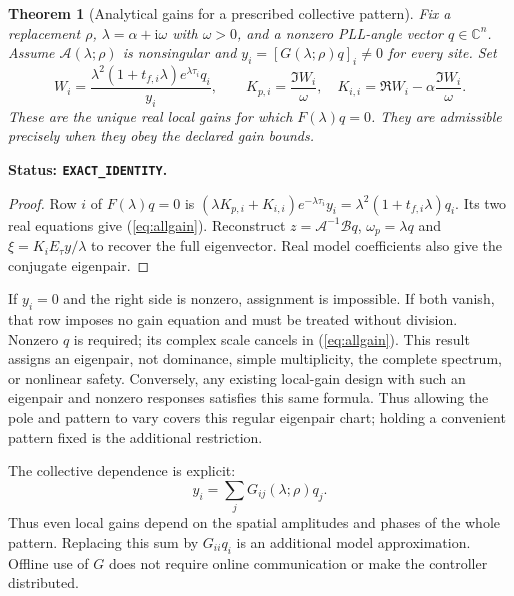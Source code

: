 \documentclass[11pt]{article}
\newtheorem{theorem}{Theorem}
\newcommand{\ii}{\mathrm{i}}
\newcommand{\status}[1]{\par\smallskip\noindent\textbf{Status: \texttt{#1}.}\ }
\begin{document}
\begin{theorem}[Analytical gains for a prescribed collective pattern]
Fix a replacement $\rho$, $\lambda=\alpha+\ii\omega$ with $\omega>0$,
and a nonzero PLL-angle vector $q\in\mathbb C^n$. Assume
$\mathcal A(\lambda;\rho)$ is nonsingular and
$y_i=[G(\lambda;\rho)q]_i\ne0$ for every site.
Set
\begin{equation}
 W_i=\frac{\lambda^2(1+t_{f,i}\lambda)e^{\lambda\tau_i}q_i}{y_i},
 \qquad
 \boxed{K_{p,i}=\frac{\Im W_i}{\omega},\quad
 K_{i,i}=\Re W_i-\alpha\frac{\Im W_i}{\omega}.} \label{eq:allgain}
\end{equation}
These are the unique real local gains for which $F(\lambda)q=0$.
They are admissible precisely when they obey the declared gain bounds.
\end{theorem}
\status{EXACT\_IDENTITY}
\begin{proof}
Row $i$ of $F(\lambda)q=0$ is
$(\lambda K_{p,i}+K_{i,i})e^{-\lambda\tau_i}y_i
=\lambda^2(1+t_{f,i}\lambda)q_i$.
Its two real equations give (\ref{eq:allgain}). Reconstruct
$z=\mathcal A^{-1}\mathcal Bq$, $\omega_p=\lambda q$ and
$\xi=K_iE_\tau y/\lambda$ to recover the full eigenvector.
Real model coefficients also give the conjugate eigenpair.
\end{proof}
If $y_i=0$ and the right side is nonzero, assignment is impossible.
If both vanish, that row imposes no gain equation and must be treated
without division. Nonzero $q$ is required; its complex scale cancels
in (\ref{eq:allgain}). This result assigns an eigenpair, not dominance,
simple multiplicity, the complete spectrum, or nonlinear safety.
Conversely, any existing local-gain design with such an eigenpair
and nonzero responses satisfies this same formula. Thus allowing
the pole and pattern to vary covers this regular eigenpair chart;
holding a convenient pattern fixed is the additional restriction.

The collective dependence is explicit:
\[
 y_i=\sum_jG_{ij}(\lambda;\rho)q_j .
\]
Thus even local gains depend on the spatial amplitudes and phases of
the whole pattern. Replacing this sum by $G_{ii}q_i$ is an additional
model approximation. Offline use of $G$ does not require online
communication or make the controller distributed.
\end{document}
